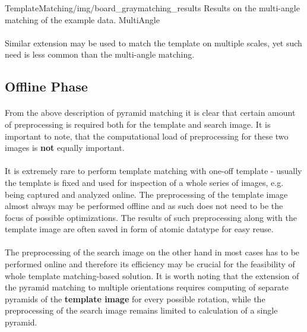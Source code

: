 \oneFigure
{TemplateMatching/img/board_graymatching_results}
{Results on the multi-angle matching of the example data.}
{MultiAngle}
{\basicWidth}

\paragraph*{}
Similar extension may be used to match the template on multiple scales, yet such need is less common than the multi-angle matching.

\subsection{Offline Phase}

\paragraph*{}
From the above description of pyramid matching it is clear that certain amount of preprocessing is required both for the template and search image. It is important to note, that the computational load of preprocessing for these two images is \textbf{not} equally important.

\paragraph*{}
It is extremely rare to perform template matching with one-off template - usually the template is fixed and used for inspection of a whole series of images, e.g. being captured and analyzed online. The preprocessing of the template image almost always may be performed offline and as such does not need to be the focus of possible optimizations. The results of such preprocessing along with the template image are often saved in form of atomic datatype for easy reuse.

\paragraph*{}
The preprocessing of the search image on the other hand in most cases has to be performed online and therefore its efficiency may be crucial for the feasibility of whole template matching-based solution. It is worth noting that the extension of the pyramid matching to multiple orientations requires computing of separate pyramids of the \textbf{template image} for every possible rotation, while the preprocessing of the search image remains limited to calculation of a single pyramid.  

